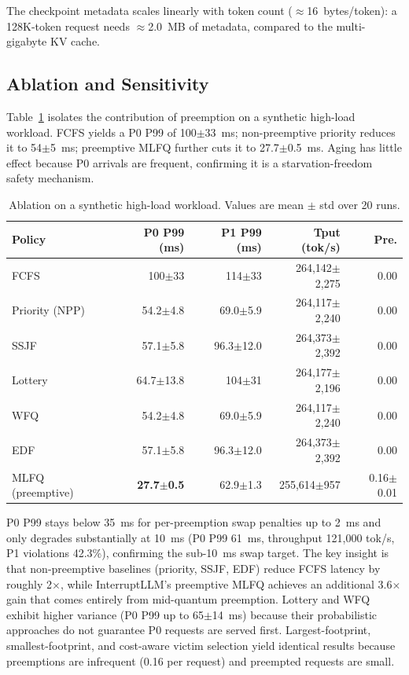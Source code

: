 \documentclass[conference]{IEEEtran}
\begin{document}
The checkpoint metadata scales linearly with token count ($\approx$16~bytes/token): a 128K-token request needs $\approx$2.0~MB of metadata, compared to the multi-gigabyte KV cache.

\subsection{Ablation and Sensitivity}

Table~\ref{tab:ablation} isolates the contribution of preemption on a synthetic high-load workload. FCFS yields a P0 P99 of 100$\pm$33~ms; non-preemptive priority reduces it to 54$\pm$5~ms; preemptive MLFQ further cuts it to 27.7$\pm$0.5~ms. Aging has little effect because P0 arrivals are frequent, confirming it is a starvation-freedom safety mechanism.

\begin{table}[t]
\caption{Ablation on a synthetic high-load workload. Values are mean $\pm$ std over 20 runs.}
\label{tab:ablation}
\centering
\footnotesize
\setlength{\tabcolsep}{2.5pt}
\begin{tabular}{@{}lrrrr@{}}
\toprule
\textbf{Policy} & \textbf{P0 P99 (ms)} & \textbf{P1 P99 (ms)} & \textbf{Tput (tok/s)} & \textbf{Pre.} \\
\midrule
FCFS & 100$\pm$33 & 114$\pm$33 & 264,142$\pm$2,275 & 0.00 \\
Priority (NPP) & 54.2$\pm$4.8 & 69.0$\pm$5.9 & 264,117$\pm$2,240 & 0.00 \\
SSJF & 57.1$\pm$5.8 & 96.3$\pm$12.0 & 264,373$\pm$2,392 & 0.00 \\
Lottery & 64.7$\pm$13.8 & 104$\pm$31 & 264,177$\pm$2,196 & 0.00 \\
WFQ & 54.2$\pm$4.8 & 69.0$\pm$5.9 & 264,117$\pm$2,240 & 0.00 \\
EDF & 57.1$\pm$5.8 & 96.3$\pm$12.0 & 264,373$\pm$2,392 & 0.00 \\
MLFQ (preemptive) & \textbf{27.7$\pm$0.5} & 62.9$\pm$1.3 & 255,614$\pm$957 & 0.16$\pm$0.01 \\
\bottomrule
\end{tabular}
\end{table}

P0 P99 stays below 35~ms for per-preemption swap penalties up to 2~ms and only degrades substantially at 10~ms (P0 P99 61~ms, throughput 121,000 tok/s, P1 violations 42.3\%), confirming the sub-10~ms swap target. The key insight is that non-preemptive baselines (priority, SSJF, EDF) reduce FCFS latency by roughly 2$\times$, while InterruptLLM's preemptive MLFQ achieves an additional 3.6$\times$ gain that comes entirely from mid-quantum preemption. Lottery and WFQ exhibit higher variance (P0 P99 up to 65$\pm$14~ms) because their probabilistic approaches do not guarantee P0 requests are served first. Largest-footprint, smallest-footprint, and cost-aware victim selection yield identical results because preemptions are infrequent (0.16 per request) and preempted requests are small.
\end{document}
